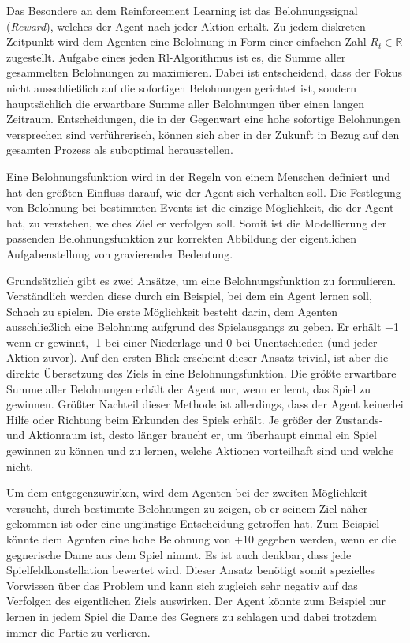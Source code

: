 Das Besondere an dem Reinforcement Learning ist das Belohnungssignal (\textit{Reward}), welches der Agent nach jeder Aktion erhält. Zu jedem diskreten Zeitpunkt wird dem Agenten eine Belohnung in Form einer einfachen Zahl $R_t \in \mathbb{R}$ zugestellt. Aufgabe eines jeden Rl-Algorithmus ist es, die Summe aller gesammelten Belohnungen zu maximieren. Dabei ist entscheidend, dass der Fokus nicht ausschließlich auf die sofortigen Belohnungen gerichtet ist, sondern hauptsächlich die erwartbare Summe aller Belohnungen über einen langen Zeitraum. Entscheidungen, die in der Gegenwart eine hohe sofortige Belohnungen versprechen sind verführerisch, können sich aber in der Zukunft in Bezug auf den gesamten Prozess als suboptimal herausstellen. 
\par 
Eine Belohnungsfunktion wird in der Regeln von einem Menschen definiert und hat den größten Einfluss darauf, wie der Agent sich verhalten soll. Die Festlegung von Belohnung bei bestimmten Events ist die einzige Möglichkeit, die der Agent hat, zu verstehen, welches Ziel er verfolgen soll. Somit ist die Modellierung der passenden Belohnungsfunktion zur korrekten Abbildung der eigentlichen Aufgabenstellung von gravierender Bedeutung.
\par 
Grundsätzlich gibt es zwei Ansätze, um eine Belohnungsfunktion zu formulieren. Verständlich werden diese durch ein Beispiel, bei dem ein Agent lernen soll, Schach zu spielen. Die erste Möglichkeit besteht darin, dem Agenten ausschließlich eine Belohnung aufgrund des Spielausgangs zu geben. Er erhält +1 wenn er gewinnt, -1 bei einer Niederlage und 0 bei Unentschieden (und jeder Aktion zuvor). Auf den ersten Blick erscheint dieser Ansatz trivial, ist aber die direkte Übersetzung des Ziels in eine Belohnungsfunktion. Die größte erwartbare Summe aller Belohnungen erhält der Agent nur, wenn er lernt, das Spiel zu gewinnen. Größter Nachteil dieser Methode ist allerdings, dass der Agent keinerlei Hilfe oder Richtung beim Erkunden des Spiels erhält. Je größer der Zustands- und Aktionraum ist, desto länger braucht er, um überhaupt einmal ein Spiel gewinnen zu können und zu lernen, welche Aktionen vorteilhaft sind und welche nicht.
\par 
Um dem entgegenzuwirken, wird dem Agenten bei der zweiten Möglichkeit versucht, durch bestimmte Belohnungen zu zeigen, ob er seinem Ziel näher gekommen ist oder eine ungünstige Entscheidung getroffen hat. Zum Beispiel könnte dem Agenten eine hohe Belohnung von +10 gegeben werden, wenn er die gegnerische Dame aus dem Spiel nimmt. Es ist auch denkbar, dass jede Spielfeldkonstellation bewertet wird. Dieser Ansatz benötigt somit spezielles Vorwissen über das Problem und kann sich zugleich sehr negativ auf das Verfolgen des eigentlichen Ziels auswirken. Der Agent könnte zum Beispiel nur lernen in jedem Spiel die Dame des Gegners zu schlagen und dabei trotzdem immer die Partie zu verlieren.
